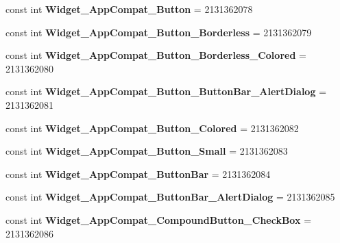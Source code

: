 \begin{DoxyCompactItemize}
const int {\bfseries Widget\+\_\+\+App\+Compat\+\_\+\+Button} = 2131362078
\item 
\mbox{\label{classXaria_1_1Resource_1_1Style_afaa60c2f1f5e2dc878ce85c81325c561}} 
const int {\bfseries Widget\+\_\+\+App\+Compat\+\_\+\+Button\+\_\+\+Borderless} = 2131362079
\item 
\mbox{\label{classXaria_1_1Resource_1_1Style_a303d7f2309d0140e1f5e7c2d75e879e1}} 
const int {\bfseries Widget\+\_\+\+App\+Compat\+\_\+\+Button\+\_\+\+Borderless\+\_\+\+Colored} = 2131362080
\item 
\mbox{\label{classXaria_1_1Resource_1_1Style_aeca3e8e8c1d737224815f1ce829ddf12}} 
const int {\bfseries Widget\+\_\+\+App\+Compat\+\_\+\+Button\+\_\+\+Button\+Bar\+\_\+\+Alert\+Dialog} = 2131362081
\item 
\mbox{\label{classXaria_1_1Resource_1_1Style_ac99e53b1c24205d6aa1d566ad982c8e9}} 
const int {\bfseries Widget\+\_\+\+App\+Compat\+\_\+\+Button\+\_\+\+Colored} = 2131362082
\item 
\mbox{\label{classXaria_1_1Resource_1_1Style_a928f0d761d86077ae2bc34f0f31072e8}} 
const int {\bfseries Widget\+\_\+\+App\+Compat\+\_\+\+Button\+\_\+\+Small} = 2131362083
\item 
\mbox{\label{classXaria_1_1Resource_1_1Style_afc7cef7366ffb1edd0e5c50c371b4711}} 
const int {\bfseries Widget\+\_\+\+App\+Compat\+\_\+\+Button\+Bar} = 2131362084
\item 
\mbox{\label{classXaria_1_1Resource_1_1Style_a3d47ff80fe165e904e010d27375e1eca}} 
const int {\bfseries Widget\+\_\+\+App\+Compat\+\_\+\+Button\+Bar\+\_\+\+Alert\+Dialog} = 2131362085
\item 
\mbox{\label{classXaria_1_1Resource_1_1Style_a90f93d8ddd94e7b02e3f68d89fd89406}} 
const int {\bfseries Widget\+\_\+\+App\+Compat\+\_\+\+Compound\+Button\+\_\+\+Check\+Box} = 2131362086
\item 
\mbox{\label{classXaria_1_1Resource_1_1Style_ab855a1db4a196dee1d8e756432eea3ed}} 

\end{DoxyCompactItemize}

